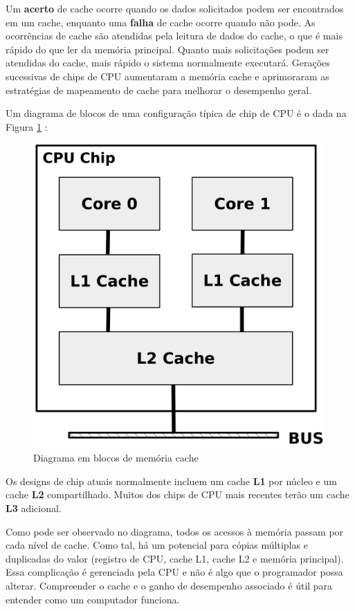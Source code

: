 Um \textbf{acerto} de cache ocorre quando os dados solicitados podem ser encontrados em um cache, enquanto uma \textbf{falha} de cache ocorre quando não pode. As ocorrências de cache são atendidas pela leitura de dados do cache, o que é mais rápido do que ler da memória principal. Quanto mais solicitações podem ser atendidas do cache, mais rápido o sistema normalmente executará. Gerações sucessivas de chips de CPU aumentaram a memória cache e aprimoraram as estratégias de mapeamento de cache para melhorar o desempenho geral.

Um diagrama de blocos de uma configuração típica de chip de CPU é o dada na Figura \ref{fig:cache} :
\begin{figure}[ht]
\begin{center}
		\includegraphics[width=0.8\linewidth]{imagens/cache}
\end{center}
	\caption{Diagrama em blocos de memória cache}
	\label{fig:cache}
\end{figure}

Os designs de chip atuais normalmente incluem um cache \textbf{L1} por núcleo e um cache \textbf{L2} compartilhado. Muitos dos chips de CPU mais recentes terão um cache \textbf{L3} adicional.

Como pode ser observado no diagrama, todos os acessos à memória passam por cada nível de cache. Como tal, há um potencial para cópias múltiplas e duplicadas do valor (registro de CPU, cache L1, cache L2 e memória principal). Essa complicação é gerenciada pela CPU e não é algo que o programador possa alterar. Compreender o cache e o ganho de desempenho associado é útil para entender como um computador funciona.

